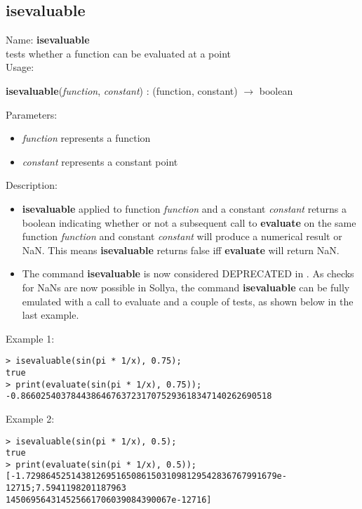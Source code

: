 \subsection{isevaluable}
\label{labisevaluable}
\noindent Name: \textbf{isevaluable}\\
\phantom{aaa}tests whether a function can be evaluated at a point \\[0.2cm]
\noindent Usage: 
\begin{center}
\textbf{isevaluable}(\emph{function}, \emph{constant}) : (\textsf{function}, \textsf{constant}) $\rightarrow$ \textsf{boolean}\\
\end{center}
Parameters: 
\begin{itemize}
\item \emph{function} represents a function
\item \emph{constant} represents a constant point
\end{itemize}
\noindent Description: \begin{itemize}

\item \textbf{isevaluable} applied to function \emph{function} and a constant \emph{constant} returns
   a boolean indicating whether or not a subsequent call to \textbf{evaluate} on the
   same function \emph{function} and constant \emph{constant} will produce a numerical
   result or NaN. This means \textbf{isevaluable} returns false iff \textbf{evaluate} will return NaN.

\item The command \textbf{isevaluable} is now considered DEPRECATED in \sollya.
   As checks for NaNs are now possible in Sollya, the command \textbf{isevaluable}
   can be fully emulated with a call to evaluate and a couple of tests, 
   as shown below in the last example.
\end{itemize}
\noindent Example 1: 
\begin{center}\begin{minipage}{15cm}\begin{Verbatim}[frame=single]
> isevaluable(sin(pi * 1/x), 0.75);
true
> print(evaluate(sin(pi * 1/x), 0.75));
-0.86602540378443864676372317075293618347140262690518
\end{Verbatim}
\end{minipage}\end{center}
\noindent Example 2: 
\begin{center}\begin{minipage}{15cm}\begin{Verbatim}[frame=single]
> isevaluable(sin(pi * 1/x), 0.5);
true
> print(evaluate(sin(pi * 1/x), 0.5));
[-1.72986452514381269516508615031098129542836767991679e-12715;7.5941198201187963
145069564314525661706039084390067e-12716]
\end{Verbatim}
\end{minipage}\end{center}
